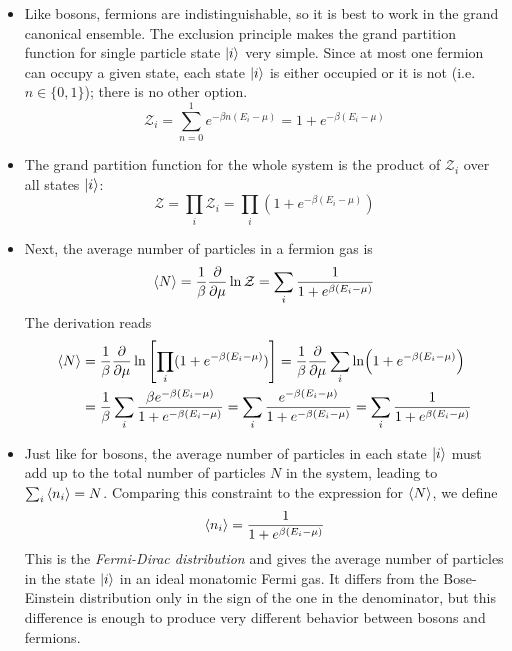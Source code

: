 \documentclass[11pt, a4paper]{article}
\begin{document}
\begin{itemize}
	\item Like bosons, fermions are indistinguishable, so it is best to work in the grand canonical ensemble. The exclusion principle makes the grand partition function for single particle state $ \ket{i} $ very simple. Since at most one fermion can occupy a given state, each state $ \ket{i} $ is either occupied or it is not (i.e. $ n \in \{0, 1\} $); there is no other option.
	\begin{equation*}
		\mathcal{Z}_{i} = \sum_{n=0}^{1}e^{-\beta n(E_{i}-\mu)} = 1 + e^{-\beta(E_{i} - \mu)}
	\end{equation*}
	
	\item The grand partition function for the whole system is the product of $ \mathcal{Z}_{i} $ over all states $ \ket{i} $:
	\begin{equation*}
		\mathcal{Z} = \prod_{i} \mathcal{Z}_{i} = \prod_{i} (1 + e^{-\beta(E_{i} - \mu)})
	\end{equation*}
	
	\item Next, the average number of particles in a fermion gas is
	\begin{equation*}
		\expval{N} = \frac{1}{\beta}\pdv{}{\mu} \ln \mathcal{Z} = \sum_{i} \frac{1}{1 + e^{\beta (E_{i} - \mu)}}
	\end{equation*}
	The derivation reads
	\begin{align*}
		\expval{N} &= \frac{1}{\beta}\pdv{}{\mu} \ln \left[\prod_{i} (1 + e^{-\beta(E_{i} - \mu)})\right] = \frac{1}{\beta} \pdv{}{\mu} \sum_{i} \ln(1 + e^{-\beta(E_{i} - \mu)})\\
		&=\frac{1}{\beta} \sum_{i} \frac{\beta e^{-\beta(E_{i}-\mu)}}{1 + e^{-\beta(E_{i} - \mu)}} = \sum_{i} \frac{e^{-\beta(E_{i}-\mu)}}{1 + e^{-\beta(E_{i} - \mu)}} = \sum_{i} \frac{1}{1 + e^{\beta (E_{i} - \mu)}}
	\end{align*}
	
	\item Just like for bosons, the average number of particles in each state $ \ket{i} $ must add up to the total number of particles $ N $ in the system, leading to $ \sum_{i}\expval{n_{i}} = N $. Comparing this constraint to the expression for $ \expval{N} $, we define
	\begin{equation*}
		\expval{n_{i}} =  \frac{1}{1 + e^{\beta (E_{i} - \mu)}}
	\end{equation*}
	This is the \textit{Fermi-Dirac distribution} and gives the average number of particles in the state $ \ket{i} $ in an ideal monatomic Fermi gas. It differs from the Bose-Einstein distribution only in the sign of the one in the denominator, but this difference is enough to produce very different behavior between bosons and fermions.
\end{itemize}
\end{document}
